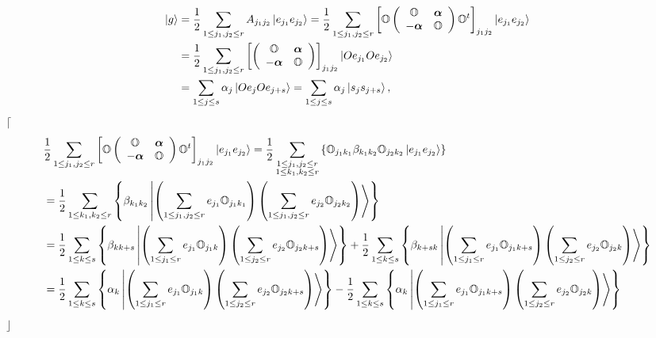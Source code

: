 \documentclass[aps,preprint]{revtex4}%
\begin{document}
\begin{align}
\left\vert g\right\rangle  &  =\frac{1}{2}\sum_{1\leq j_{1},j_{2}\leq
r}A_{j_{1}j_{2}}\left\vert e_{j_{1}}e_{j_{2}}\right\rangle =\frac{1}{2}%
\sum_{1\leq j_{1},j_{2}\leq r}\left[  \mathbb{O}\left(
\begin{array}
[c]{cc}%
\mathbb{O} & \boldsymbol{\alpha}\\
-\boldsymbol{\alpha} & \mathbb{O}%
\end{array}
\right)  \mathbb{O}^{t}\right]  _{j_{1}j_{2}}\left\vert e_{j_{1}}e_{j_{2}%
}\right\rangle \\
&  =\frac{1}{2}\sum_{1\leq j_{1},j_{2}\leq r}\left[  \left(
\begin{array}
[c]{cc}%
\mathbb{O} & \boldsymbol{\alpha}\\
-\boldsymbol{\alpha} & \mathbb{O}%
\end{array}
\right)  \right]  _{j_{1}j_{2}}\left\vert Oe_{j_{1}}Oe_{j_{2}}\right\rangle \\
&  =\sum_{1\leq j\leq s}\alpha_{j}\left\vert Oe_{j}Oe_{j+s}\right\rangle
=\sum_{1\leq j\leq s}\alpha_{j}\left\vert s_{j}s_{j+s}\right\rangle ,
\end{align}
$\lceil$%
\begin{align}
&  \frac{1}{2}\sum_{1\leq j_{1},j_{2}\leq r}\left[  \mathbb{O}\left(
\begin{array}
[c]{cc}%
\mathbb{O} & \boldsymbol{\alpha}\\
-\boldsymbol{\alpha} & \mathbb{O}%
\end{array}
\right)  \mathbb{O}^{t}\right]  _{j_{1}j_{2}}\left\vert e_{j_{1}}e_{j_{2}%
}\right\rangle =\frac{1}{2}\sum_{\substack{1\leq j_{1},j_{2}\leq r\\1\leq
k_{1},k_{2}\leq r}}\left\{  \mathbb{O}_{j_{1}k_{1}}\beta_{k_{1}k_{2}%
}\mathbb{O}_{j_{2}k_{2}}\left\vert e_{j_{1}}e_{j_{2}}\right\rangle \right\} \\
&  =\frac{1}{2}\sum_{1\leq k_{1},k_{2}\leq r}\left\{  \beta_{k_{1}k_{2}%
}\left\vert \left(  \sum_{1\leq j_{1},j_{2}\leq r}e_{j_{1}}\mathbb{O}%
_{j_{1}k_{1}}\right)  \left(  \sum_{1\leq j_{1},j_{2}\leq r}e_{j_{2}%
}\mathbb{O}_{j_{2}k_{2}}\right)  \right\rangle \right\} \\
&  =\frac{1}{2}\sum_{1\leq k\leq s}\left\{  \beta_{kk+s}\left\vert \left(
\sum_{1\leq j_{1}\leq r}e_{j_{1}}\mathbb{O}_{j_{1}k}\right)  \left(
\sum_{1\leq j_{2}\leq r}e_{j_{2}}\mathbb{O}_{j_{2}k+s}\right)  \right\rangle
\right\}  +\frac{1}{2}\sum_{1\leq k\leq s}\left\{  \beta_{k+sk}\left\vert
\left(  \sum_{1\leq j_{1}\leq r}e_{j_{1}}\mathbb{O}_{j_{1}k+s}\right)  \left(
\sum_{1\leq j_{2}\leq r}e_{j_{2}}\mathbb{O}_{j_{2}k}\right)  \right\rangle
\right\} \\
&  =\frac{1}{2}\sum_{1\leq k\leq s}\left\{  \alpha_{k}\left\vert \left(
\sum_{1\leq j_{1}\leq r}e_{j_{1}}\mathbb{O}_{j_{1}k}\right)  \left(
\sum_{1\leq j_{2}\leq r}e_{j_{2}}\mathbb{O}_{j_{2}k+s}\right)  \right\rangle
\right\}  -\frac{1}{2}\sum_{1\leq k\leq s}\left\{  \alpha_{k}\left\vert
\left(  \sum_{1\leq j_{1}\leq r}e_{j_{1}}\mathbb{O}_{j_{1}k+s}\right)  \left(
\sum_{1\leq j_{2}\leq r}e_{j_{2}}\mathbb{O}_{j_{2}k}\right)  \right\rangle
\right\}
\end{align}
$\rfloor$
\end{document}
